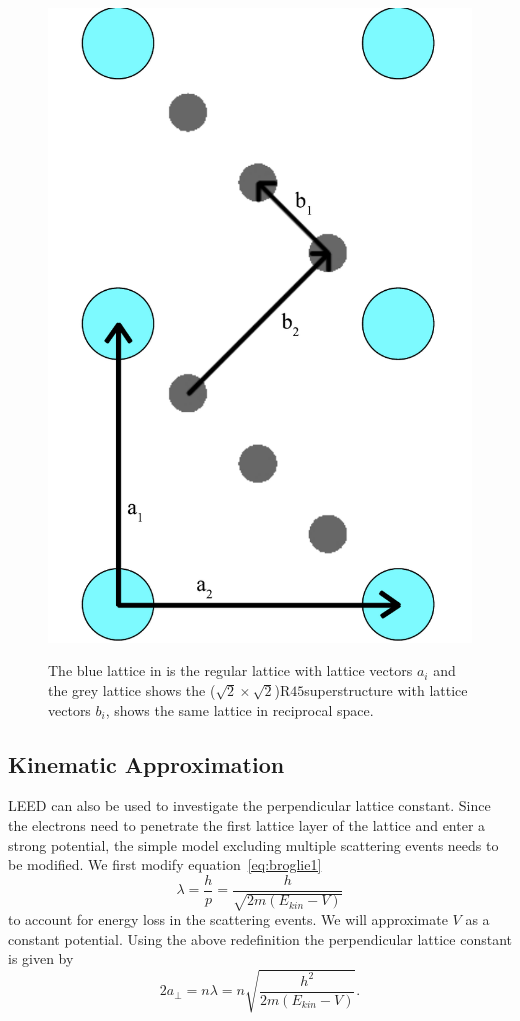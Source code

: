 \documentclass[a4paper,10pt]{scrartcl}
\begin{document}
\begin{figure}
{\includegraphics[scale=0.25]{img/superstructure2}
\label{fig:sup2}
}
\caption{The blue lattice in  is the regular lattice with lattice vectors $a_i$ and the grey lattice shows the ($\sqrt{2} \times \sqrt{2}$)R$45$\textdegree superstructure with lattice vectors $b_i$,  shows the same lattice in reciprocal space.}
\end{figure}

\subsection{Kinematic Approximation}

LEED can also be used to investigate the perpendicular lattice constant. Since the electrons need to penetrate the first lattice layer of the lattice and enter a strong potential, the simple model excluding multiple scattering events needs to be modified. We first modify equation~\eqref{eq:broglie1}
\begin{equation}
\lambda = \frac{h}{p} = \frac{h}{\sqrt{2m(E_{kin}-V)}}
\end{equation}
to account for energy loss in the scattering events. We will approximate $V$ as a constant potential. Using the above redefinition the perpendicular lattice constant is given by
\begin{equation}
2a_{\perp} = n\lambda = n \sqrt{\frac{h^{2}}{2m(E_{kin}-V)}}.
\end{equation}
\end{document}
